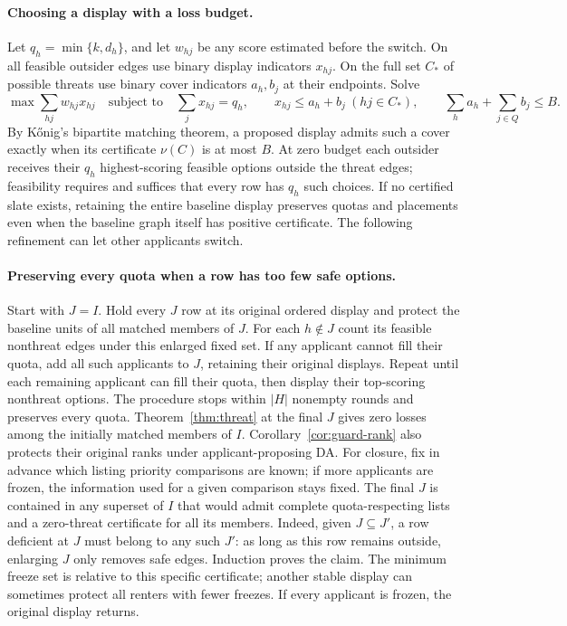 \paragraph{Choosing a display with a loss budget.}
Let $q_h=\min\{k,d_h\}$, and let $w_{hj}$ be any score estimated before the
switch. On all feasible outsider edges use binary display indicators $x_{hj}$.
On the full set $C_*$ of possible threats use binary cover indicators
$a_h,b_j$ at their endpoints. Solve
\[
 \max \sum_{hj}w_{hj}x_{hj}
 \quad\text{subject to}\quad
 \sum_j x_{hj}=q_h,\qquad
 x_{hj}\le a_h+b_j\ (hj\in C_*),\qquad
 \sum_h a_h+\sum_{j\in Q}b_j\le B .
\]
By K\H{o}nig's bipartite matching theorem, a proposed display admits such
a cover exactly when its certificate $\nu(C)$ is at most $B$. At zero budget
each outsider receives their $q_h$ highest-scoring feasible options outside
the threat edges; feasibility requires and suffices that every row has $q_h$
such choices. If no certified slate exists, retaining the entire baseline
display preserves quotas and placements even when the baseline graph itself
has positive certificate. The following refinement can let other applicants switch.

\paragraph{Preserving every quota when a row has too few safe options.}
Start with $J=I$. Hold every $J$ row at its original ordered display and
protect the baseline units of all matched members of $J$. For each $h\notin J$
count its feasible nonthreat edges under this enlarged fixed set. If any
applicant cannot fill their quota, add all such applicants to $J$, retaining
their original displays. Repeat until each remaining applicant can fill their
quota, then display their top-scoring nonthreat options. The procedure stops
within $|H|$ nonempty rounds and preserves every quota. Theorem~\ref{thm:threat}
at the final $J$ gives zero losses among the initially matched members of $I$. Corollary~\ref{cor:guard-rank} also protects their original ranks under applicant-proposing DA.
For closure, fix in advance which listing priority comparisons are known; if more applicants are frozen, the information used for a given comparison stays fixed. The final $J$ is contained in any superset of $I$ that would admit complete
quota-respecting lists and a zero-threat certificate for all its members.
Indeed, given $J\subseteq J'$, a row deficient at $J$ must belong to any such
$J'$: as long as this row remains outside, enlarging $J$ only removes safe
edges. Induction proves the claim. The minimum freeze set is relative to this
specific certificate; another stable display can sometimes protect all renters
with fewer freezes. If every applicant is frozen, the original display returns.

